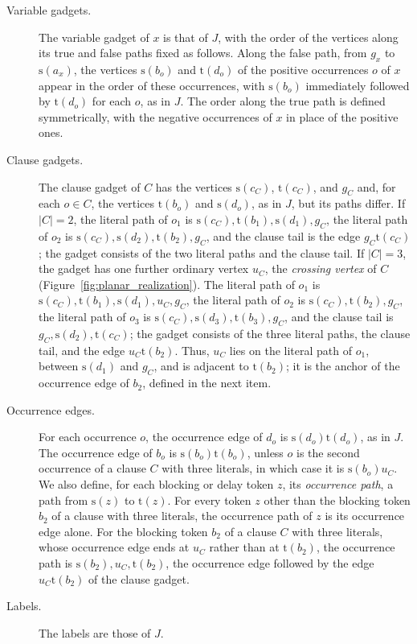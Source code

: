 \documentclass[a4paper,USenglish,thm-restate]{lipics-v2021}
\newcommand{\src}{\mathrm{s}}
\newcommand{\tgt}{\mathrm{t}}
\theoremstyle{problemstyle}
\begin{document}
\begin{description}
\item[Variable gadgets.] The variable gadget of $x$ is that of $J$, with
the order of the vertices along its true and false paths fixed as follows.
Along the false path, from $g_x$ to $\src(a_x)$, the vertices $\src(b_o)$
and $\tgt(d_o)$ of the positive occurrences $o$ of $x$ appear in the order
of these occurrences, with
$\src(b_o)$ immediately followed by $\tgt(d_o)$ for each $o$, as in $J$.
The order along the true path is defined symmetrically, with the negative
occurrences of $x$ in place of the positive ones.

\item[Clause gadgets.] The clause gadget of $C$ has the vertices
$\src(c_C)$, $\tgt(c_C)$, and $g_C$ and, for each $o\in C$, the vertices
$\tgt(b_o)$ and $\src(d_o)$, as in $J$, but its paths differ. If $|C|=2$,
the literal path of $o_1$ is $\src(c_C),\tgt(b_1),\src(d_1),g_C$,
the literal path of $o_2$ is $\src(c_C),\src(d_2),\tgt(b_2),g_C$, and the
clause tail is the edge $g_C\tgt(c_C)$; the gadget consists of the
two literal paths and the clause tail. If $|C|=3$, the gadget has one
further ordinary vertex $u_C$, the \emph{crossing vertex} of $C$
(Figure~\ref{fig:planar_realization}). The
literal path of $o_1$ is $\src(c_C),\tgt(b_1),\src(d_1),u_C,g_C$, the
literal path of $o_2$ is $\src(c_C),\tgt(b_2),g_C$, the literal path of
$o_3$ is $\src(c_C),\src(d_3),\tgt(b_3),g_C$, and the clause tail is
$g_C,\src(d_2),\tgt(c_C)$; the gadget consists of the three literal paths,
the clause tail, and the edge $u_C\tgt(b_2)$. Thus, $u_C$ lies on the
literal path of $o_1$, between $\src(d_1)$ and $g_C$, and is adjacent to
$\tgt(b_2)$; it is the anchor of the occurrence edge of $b_2$, defined in
the next item.

\item[Occurrence edges.] For each occurrence $o$, the occurrence edge of
$d_o$ is $\src(d_o)\tgt(d_o)$, as in $J$. The occurrence edge of $b_o$ is
$\src(b_o)\tgt(b_o)$, unless $o$ is the second occurrence of a clause $C$
with three literals, in which case it is $\src(b_o)u_C$. We also define,
for each blocking or delay token $z$, its \emph{occurrence path}, a path
from $\src(z)$ to $\tgt(z)$. For every token $z$ other than the blocking
token $b_2$ of a clause with three literals, the occurrence path of $z$ is
its occurrence edge alone. For the blocking token $b_2$ of a clause $C$
with three literals, whose occurrence edge ends at $u_C$ rather than at
$\tgt(b_2)$, the occurrence path is $\src(b_2),u_C,\tgt(b_2)$, the
occurrence edge followed by the edge $u_C\tgt(b_2)$ of the clause gadget.

\item[Labels.] The labels are those of $J$.
\end{description}
\end{document}
